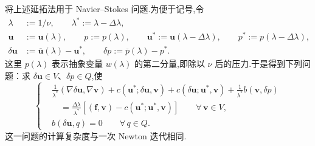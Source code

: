 将上述延拓法用于 Navier--Stokes 问题.为便于记号,令
\[
  \begin{aligned}
    \lambda&:=1/\nu,\qquad \lambda^*:=\lambda-\Delta\lambda,\\
    \boldsymbol{u}&:=\boldsymbol{u}(\lambda),\qquad p:=p(\lambda),\qquad
    \boldsymbol{u}^*:=\boldsymbol{u}(\lambda-\Delta\lambda),\qquad
    p^*:=p(\lambda-\Delta\lambda),\\
    \delta\boldsymbol{u}&:=\overline{\boldsymbol{u}}(\lambda)-\boldsymbol{u}^*,\qquad
    \delta p:=\overline p(\lambda)-p^*.
  \end{aligned}
\]
这里 \(p(\lambda)\) 表示抽象变量 \(w(\lambda)\) 的第二分量,即除以 \(\nu\) 后的压力.于是得到下列问题：求 \(\delta\boldsymbol{u}\in V\)、\(\delta p\in Q\),使
\begin{equation}\label{eq:10.3.12}
  \left\{
  \begin{aligned}
    &\frac1{\lambda^*}(\nabla\delta\boldsymbol{u},\nabla\boldsymbol{v})
       +c(\boldsymbol{u}^*;\delta\boldsymbol{u},\boldsymbol{v})
       +c(\delta\boldsymbol{u};\boldsymbol{u}^*,\boldsymbol{v})
       +\frac1{\lambda^*}b(\boldsymbol{v},\delta p)\\
    &\quad=\frac{\Delta\lambda}{\lambda^*}
           [(\boldsymbol{f},\boldsymbol{v})-c(\boldsymbol{u}^*;\boldsymbol{u}^*,\boldsymbol{v})]
          \qquad\forall\,\boldsymbol{v}\in V,\\
    &b(\delta\boldsymbol{u},q)=0\qquad\forall\,q\in Q .
  \end{aligned}
  \right.
\end{equation}
这一问题的计算复杂度与一次 Newton 迭代相同.

